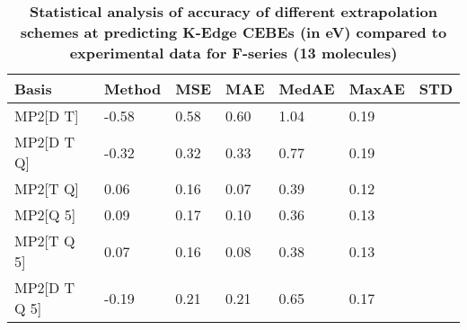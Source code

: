 \begin{table}
  \caption{\textbf{Statistical analysis of accuracy of different extrapolation schemes at predicting K-Edge CEBEs (in eV) compared to experimental data for F-series (13 molecules)}}
  \begin{tabular}{l l l l l l l }
    \toprule
    \textbf{Basis} & \textbf{Method} & \textbf{MSE} & \textbf{MAE} & \textbf{MedAE} & \textbf{MaxAE} & \textbf{STD} \\ 
    \midrule
    MP2[D T] & -0.58 & 0.58 & 0.60 & 1.04 & 0.19 \\ 
    MP2[D T Q] & -0.32 & 0.32 & 0.33 & 0.77 & 0.19 \\ 
    MP2[T Q] & 0.06 & 0.16 & 0.07 & 0.39 & 0.12 \\ 
    MP2[Q 5] & 0.09 & 0.17 & 0.10 & 0.36 & 0.13 \\ 
    MP2[T Q 5] & 0.07 & 0.16 & 0.08 & 0.38 & 0.13 \\ 
    MP2[D T Q 5] & -0.19 & 0.21 & 0.21 & 0.65 & 0.17 \\ 
    \bottomrule
  \end{tabular}
\end{table}
